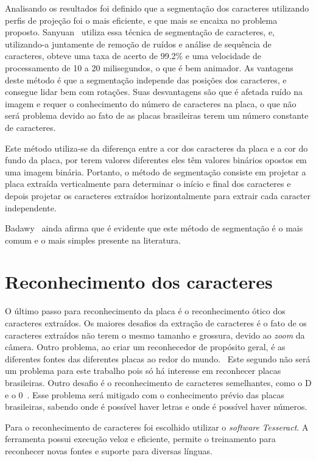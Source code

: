 Analisando os resultados foi definido que a segmentação dos caracteres
utilizando perfis de projeção foi o mais eficiente, e que mais se encaixa no
problema proposto. Sanyuan~\cite{sanyuan2004car} utiliza essa técnica de
segmentação de caracteres, e, utilizando-a juntamente de remoção de ruídos e
análise de sequência de caracteres, obteve uma taxa de acerto de 99.2\% e uma
velocidade de processamento de 10 a 20 milisegundos, o que é bem animador. As
vantagens deste método é que a segmentação independe das posições dos
caracteres, e consegue lidar bem com rotações. Suas desvantagens são que é
afetada ruído na imagem e requer o conhecimento do número de caracteres na
placa, o que não será problema devido ao fato de as placas brasileiras terem um
número constante de caracteres.

Este método utiliza-se da diferença entre a cor dos caracteres da placa e a cor
do fundo da placa, por terem valores diferentes eles têm valores binários
opostos em uma imagem binária. Portanto, o método de segmentação consiste em
projetar a placa extraída verticalmente para determinar o início e final dos
caracteres e depois projetar os caracteres extraídos horizontalmente para
extrair cada caracter independente.

Badawy~\cite{s2013automatic} ainda afirma que é evidente que este método de
segmentação é o mais comum e o mais simples presente na literatura.

\section{Reconhecimento dos caracteres} \label{sec:reconhecimento}

O último passo para reconhecimento da placa é o reconhecimento ótico dos
caracteres extraídos. Os maiores desafios da extração de caracteres é o fato de
os caracteres extraídos não terem o mesmo tamanho e grossura, devido ao
\emph{zoom} da câmera. Outro problema, ao criar um reconhecedor de propósito
geral, é as diferentes fontes das diferentes placas ao redor do mundo.~\cite{s2013automatic}
Este segundo não será um problema para este trabalho pois
só há interesse em reconhecer placas brasileiras. Outro desafio é o
reconhecimento de caracteres semelhantes, como o D e o
0~\cite{ho2016intelligent}.  Esse problema será mitigado com o conhecimento
prévio das placas brasileiras, sabendo onde é possível haver letras e onde é
possível haver números.

Para o reconhecimento de caracteres foi escolhido utilizar o \emph{software}
\emph{Tesseract}. A ferramenta possui execução veloz e eficiente, permite o
treinamento para reconhecer novas fontes e suporte para diversas línguas.
